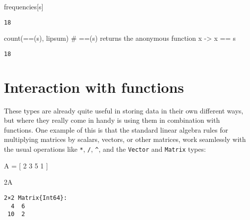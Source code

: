\documentclass[
  letterpaper,
  DIV=11,
  numbers=noendperiod]{scrreprt}
\newenvironment{Shaded}{\begin{snugshade}}{\end{snugshade}}
\newcommand{\CharTok}[1]{\textcolor[rgb]{0.13,0.47,0.30}{#1}}
\newcommand{\CommentTok}[1]{\textcolor[rgb]{0.37,0.37,0.37}{#1}}
\newcommand{\FloatTok}[1]{\textcolor[rgb]{0.68,0.00,0.00}{#1}}
\newcommand{\FunctionTok}[1]{\textcolor[rgb]{0.28,0.35,0.67}{#1}}
\newcommand{\NormalTok}[1]{\textcolor[rgb]{0.00,0.23,0.31}{#1}}
\newcommand{\OperatorTok}[1]{\textcolor[rgb]{0.37,0.37,0.37}{#1}}
\begin{document}
\begin{Shaded}
\begin{Highlighting}[]
\NormalTok{frequencies[}\CharTok{\textquotesingle{}s\textquotesingle{}}\NormalTok{]}
\end{Highlighting}
\end{Shaded}

\begin{verbatim}
18
\end{verbatim}

\begin{Shaded}
\begin{Highlighting}[]
\FunctionTok{count}\NormalTok{(}\OperatorTok{==}\NormalTok{(}\CharTok{\textquotesingle{}s\textquotesingle{}}\NormalTok{), lipsum) }\CommentTok{\# ==(\textquotesingle{}s\textquotesingle{}) returns the anonymous function x {-}\textgreater{} x == \textquotesingle{}s\textquotesingle{}}
\end{Highlighting}
\end{Shaded}

\begin{verbatim}
18
\end{verbatim}

\hypertarget{interaction-with-functions}{%
\section{Interaction with functions}\label{interaction-with-functions}}

These types are already quite useful in storing data in their own
different ways, but where they really come in handy is using them in
combination with functions. One example of this is that the standard
linear algebra rules for multiplying matrices by scalars, vectors, or
other matrices, work seamlessly with the usual operations like
\texttt{*}, \texttt{/}, \texttt{\^{}}, and the \texttt{Vector} and
\texttt{Matrix} types:

\begin{Shaded}
\begin{Highlighting}[]
\NormalTok{A }\OperatorTok{=}\NormalTok{ [ }\FloatTok{2} \FloatTok{3} 
      \FloatTok{5} \FloatTok{1}\NormalTok{ ]}

\FloatTok{2}\NormalTok{A}
\end{Highlighting}
\end{Shaded}

\begin{verbatim}
2×2 Matrix{Int64}:
  4  6
 10  2
\end{verbatim}
\end{document}
